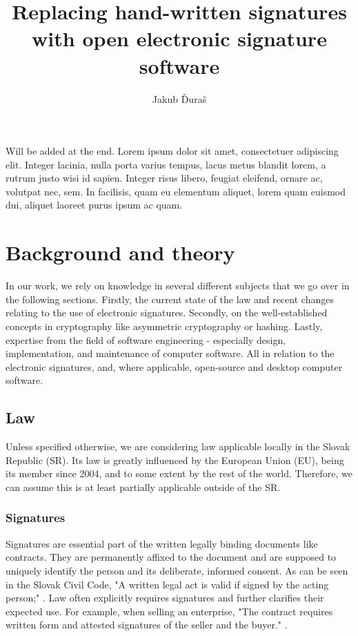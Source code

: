 \documentclass[thesismargins, english, thesislinespacing, twoside, openright, upjsfrontpage]{rnthesis}
\title{Replacing hand-written signatures with open electronic signature software}
\author{Jakub Ďuraš}
\begin{document}
\maketitle
\newpage
\tableofcontents
\listoffigures
\listoftables

\uvod

Will be added at the end. Lorem ipsum dolor sit amet, consectetuer adipiscing elit.
Integer lacinia, nulla porta varius tempus, lacus metus blandit
lorem, a rutrum justo wisi id sapien. Integer risus libero,
feugiat eleifend, ornare ac, volutpat nec, sem. In facilisis,
quam eu elementum aliquet, lorem quam euismod dui, aliquet
laoreet purus ipsum ac quam.


\chapter{Background and theory}

In our work, we rely on knowledge in several different subjects that we go over in the following sections.
Firstly, the current state of the law and recent changes relating to the use of electronic signatures.
Secondly, on the well-established concepts in cryptography like asymmetric cryptography or hashing.
Lastly, expertise from the field of software engineering - especially design, implementation, and maintenance of computer software.
All in relation to the electronic signatures, and, where applicable, open-source and desktop computer software.

\section{Law}

Unless specified otherwise, we are considering law applicable locally in the Slovak Republic (SR).
Its law is greatly influenced by the European Union (EU), being its member since 2004, and to some extent by the rest of the world.
Therefore, we can assume this is at least partially applicable outside of the SR.

\subsection{Signatures}

Signatures are essential part of the written legally binding documents like contracts.
They are permanently affixed to the document and are supposed to uniquely identify the person and its deliberate, informed consent.
As can be seen in the Slovak Civil Code, "A written legal act is valid if signed by the acting person;" \cite{1}.
Law often explicitly requires signatures and further clarifies their expected use.
For example, when selling an enterprise, "The contract requires written form and attested signatures of the seller and the buyer." \cite{2}.
\end{document}
